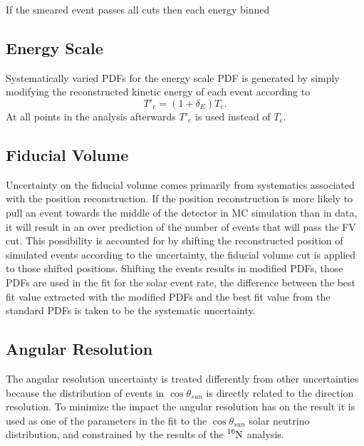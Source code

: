 If the smeared event passes all cuts then each energy binned

\subsection{Energy Scale}
Systematically varied PDFs for the energy scale PDF is generated by simply modifying the reconstructed
kinetic energy of each event according to
\begin{equation}
  T\prime_{e} = (1+\delta_{E})T_{e}\text{.}
\end{equation}
At all points in the analysis afterwards $T\prime_{e}$ is used instead of $T_{e}$.
\subsection{Fiducial Volume}
Uncertainty on the fiducial volume comes primarily from systematics associated
with the position reconstruction.
If the position reconstruction is more likely to pull an event towards the
middle of the detector
in MC simulation than in data, it will result in an over prediction of the
number of events that will pass the FV cut.
This possibility is accounted for by shifting the reconstructed position of
simulated events according to the uncertainty, the fiducial volume cut is
applied to those shifted positions.  Shifting the events results in modified
PDFs, those PDFs are used in the fit for the solar event rate, the difference
between the best fit value extracted with the modified PDFs and the best fit
value from the standard PDFs is taken to be the systematic uncertainty.
\subsection{Angular Resolution}
The angular resolution uncertainty is treated differently from other
uncertainties because the distribution of events in $\cos\theta_{sun}$ is
directly related to the direction resolution.  To minimize the impact the
angular resolution has on the result it is used as one of the parameters in the
fit to the $\cos\theta_{sun}$ solar neutrino distribution, and constrained by
the results of the $\ce{^{16}N}$ analysis.

